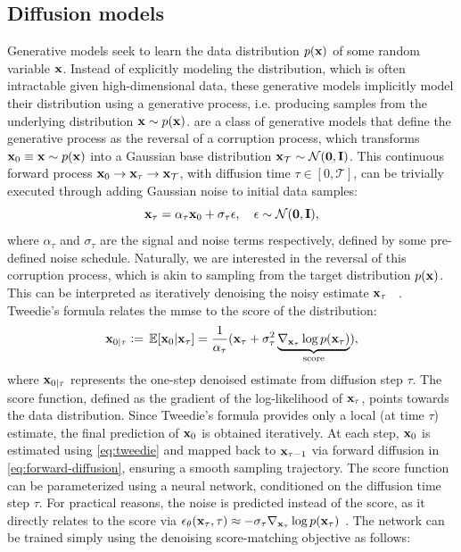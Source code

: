\documentclass[journal,twoside,web,dvipsnames]{ieeecolor}          %
\begin{document}
\subsection{Diffusion models}\label{sec:diffusion}
Generative models seek to learn the data distribution $p({\mathbf{x}})$ of some random variable ${\mathbf{x}}$. Instead of explicitly modeling the distribution, which is often intractable given high-dimensional data, these generative models implicitly model their distribution using a generative process, i.e. producing samples from the underlying distribution ${\mathbf{x}} \sim p({\mathbf{x}})$.  \cite{ho2020denoising, song2020score} are a class of generative models that define the generative process as the reversal of a corruption process, which transforms ${{\mathbf{x}}_0 \equiv {\mathbf{x}} \sim p({\mathbf{x}})}$ into a Gaussian base distribution ${{\mathbf{x}}_{\mathcal{T}} \sim \mathcal{N}(\mathbf{0}, {\mathbf{I}})}$. This continuous forward process ${{\mathbf{x}}_0\rightarrow{\mathbf{x}}_\tau \rightarrow{\mathbf{x}}_\mathcal{T}}$, with diffusion time $\tau\in\left[0, \mathcal{T}\right]$, can be trivially executed through adding Gaussian noise to initial data samples:
\begin{equation}
\label{eq:forward-diffusion}
    {\mathbf{x}}_\tau = \alpha_\tau {\mathbf{x}}_0 + \sigma_\tau {\mathbf{\epsilon}}, \quad {\mathbf{\epsilon}} \sim\mathcal{N}(\mathbf{0}, {\mathbf{I}}),
\end{equation}
where $\alpha_\tau$ and $\sigma_\tau$ are the signal and noise terms respectively, defined by some pre-defined noise schedule. Naturally, we are interested in the reversal of this corruption process, which is akin to sampling from the target distribution $p({\mathbf{x}})$. This can be interpreted as iteratively denoising the noisy estimate ${\mathbf{x}}_\tau$ ~\cite{milanfar2024denoising}. Tweedie's formula relates the \acrfull{mmse} to the score of the distribution:
\begin{equation}
\label{eq:tweedie}
    {\mathbf{x}}_{0\mid\tau} \vcentcolon=\, \mathbb{E}[{\mathbf{x}}_0\vert{\mathbf{x}}_\tau] = \frac{1}{\alpha_\tau}({\mathbf{x}}_\tau + \sigma_\tau^2 \underbrace{\nabla_{{\mathbf{x}}_\tau} \log p({\mathbf{x}}_\tau)}_{\text{score}}),
\end{equation}
where ${\mathbf{x}}_{0\mid\tau}$ represents the one-step denoised estimate from diffusion step $\tau$. The score function, defined as the gradient of the log-likelihood of ${\mathbf{x}}_\tau$, points towards the data distribution. Since Tweedie’s formula provides only a local (at time $\tau$) estimate, the final prediction of ${\mathbf{x}}_0$  is obtained iteratively. At each step, ${\mathbf{x}}_0$ is estimated using \eqref{eq:tweedie} and mapped back to ${\mathbf{x}}_{\tau-1}$ via forward diffusion in \eqref{eq:forward-diffusion}, ensuring a smooth sampling trajectory. The score function can be parameterized using a neural network, conditioned on the diffusion time step $\tau$. For practical reasons, the noise is predicted instead of the score, as it directly relates to the score via ${\mathbf{\epsilon}}_\theta({\mathbf{x}}_\tau, \tau)\approx -\sigma_\tau\nabla_{{\mathbf{x}}_\tau} \log p({\mathbf{x}}_\tau)$ \cite{song2020denoising}. The network can be trained simply using the denoising score-matching objective as follows:
\end{document}
